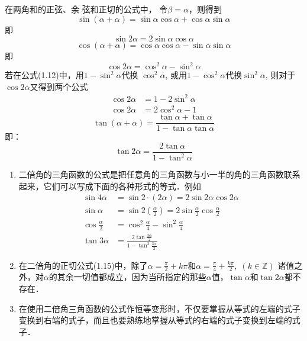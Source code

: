 在两角和的正弦、余
弦和正切的公式中，
令$\beta=\alpha$，则得到
\[\sin(\alpha+\alpha)=\sin\alpha\cos\alpha+\cos\alpha\sin\alpha\]
即
\begin{equation}
    \sin2\alpha=2\sin\alpha\cos\alpha
\end{equation}
\[\cos(\alpha+\alpha)=\cos\alpha\cos\alpha-\sin\alpha\sin\alpha\]
即
\begin{equation}
    \cos2\alpha=\cos^2\alpha-\sin^2\alpha
\end{equation}
若在公式(1.12)中，用$1-\sin^2\alpha$代换 $\cos^2\alpha$, 或用$1-\cos^2\alpha$代换$\sin^2\alpha$, 则对于$\cos2\alpha$又得到两个公式
\begin{align}
    \cos2\alpha&=1-2\sin^2\alpha\\
    \cos2\alpha&=2\cos^2\alpha-1 
\end{align}
\[\tan (\alpha+\alpha)=\frac{\tan\alpha+\tan\alpha}{1-\tan\alpha\tan\alpha}\]
即：
\begin{equation}
    \tan2\alpha=\frac{2\tan\alpha}{1-\tan^2\alpha}
\end{equation}

\begin{rmk}
\begin{enumerate}
    \item 二倍角的三角函数的公式是把任意角的三角函数与小一半的角的三角函数联系起来，它们可以写成下面的各种形式的等式．例如
\[\begin{split}
    \sin4\alpha&=\sin2\cdot (2\alpha) =2\sin2\alpha\cos2\alpha\\
    \sin\alpha&=\sin2\left(\frac{\alpha}{2}\right)=2\sin\frac{\alpha}{2}\cos \frac{\alpha}{2}\\
    \cos\frac{\alpha}{2}&=\cos^2\frac{\alpha}{4}-\sin^2\frac{\alpha}{4}\\
    \tan3\alpha&=\frac{2\tan\frac{3\alpha}{2}}{1-\tan^2\frac{3\alpha}{2}}
\end{split}\]

\item 在二倍角的正切公式(1.15)中，除了$\alpha=\frac{\pi}{2}+k\pi$和$\alpha=\frac{\pi}{4}+\frac{k\pi}{2},\; (k\in\mathbb{Z})$
诸值之外，对$\alpha$的其余一切值都成立，因为当所指定的那些$\alpha$值，$\tan\alpha$和$\tan2\alpha$都不存在．
\item 在使用二倍角三角函数的公式作恒等变形时，不仅要掌握从等式的左端的式子变换到右端的式子，而且也要熟练地掌握从等式的右端的式子变换到左端的式子．
\end{enumerate}
\end{rmk}

